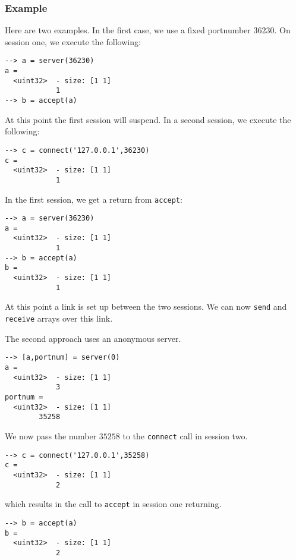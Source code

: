 \subsubsection{Example}
Here are two examples.  In the first case, we use a fixed portnumber $36230$.
On session one, we execute the following:
\begin{verbatim}
--> a = server(36230)
a =
  <uint32>  - size: [1 1]
            1
--> b = accept(a)
\end{verbatim}
At this point the first session will suspend.  In a second session, we execute the following:
\begin{verbatim}
--> c = connect('127.0.0.1',36230)
c =
  <uint32>  - size: [1 1]
            1
\end{verbatim}
In the first session, we get a return from \verb|accept|:
\begin{verbatim}
--> a = server(36230)
a =
  <uint32>  - size: [1 1]
            1
--> b = accept(a)
b =
  <uint32>  - size: [1 1]
            1
\end{verbatim}
At this point a link is set up between the two sessions.  We can now \verb|send| and \verb|receive| arrays over this link.

The second approach uses an anonymous server.
\begin{verbatim}
--> [a,portnum] = server(0)
a =
  <uint32>  - size: [1 1]
            3
portnum =
  <uint32>  - size: [1 1]
        35258
\end{verbatim}
We now pass the number $35258$ to the \verb|connect| call in session two.
\begin{verbatim}
--> c = connect('127.0.0.1',35258)
c =
  <uint32>  - size: [1 1]
            2
\end{verbatim}
which results in the call to \verb|accept| in session one returning.
\begin{verbatim}
--> b = accept(a)
b =
  <uint32>  - size: [1 1]
            2
\end{verbatim}
